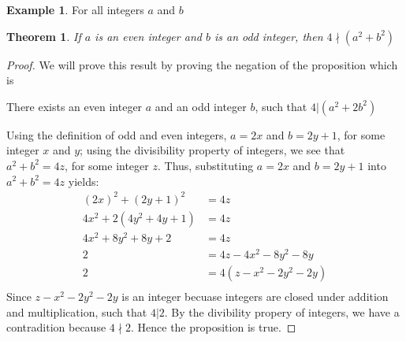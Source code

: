 \documentclass{book}
\newtheorem{theorem}{Theorem}[section]
\theoremstyle{definition}
\newtheorem{example}{Example}[definition]
\theoremstyle{remark}
\begin{document}
\newpage
\begin{example}
For all integers $a$ and $b$
\begin{tcolorbox}
	\begin{theorem}
	\label{the2}		
		If $a$ is an even integer and $b$ is an odd integer, then $4 \nmid (a^2 + b^2)$ 
	\end{theorem}
\end{tcolorbox}

\begin{proof}
    We will prove this result by proving the negation of the proposition which is
    	\begin{center}
    		There exists an even integer $a$ and an odd integer $b$, such that $4 | (a^2 + 2b^2)$
    	\end{center}
    
    Using the definition of odd and even integers, $a = 2x$ and $b = 2y + 1$, for some integer $x$ and $y$; using the divisibility property of integers, we see that $a^2 + b^2 = 4z$, for some integer $z$. Thus, substituting $a = 2x$ and $b = 2y + 1$ into $a^2 + b^2 = 4z$ yields: 
        \begin{align*}
            (2x)^2 + (2y + 1)^2 & = 4z \\
            4x^2 + 2(4y^2 + 4y + 1) & = 4z \\
            4x^2 + 8y^2 + 8y + 2 & = 4z \\
            2 & = 4z - 4x^2 - 8y^2 - 8y  \\
            2 & = 4(z - x^2 - 2y^2 - 2y) \\
        \end{align*}
    Since $z - x^2 - 2y^2 - 2y$ is an integer becuase integers are closed under addition and multiplication, such that $4 | 2$. By the divibility propery of integers, we have a contradition because $4 \nmid 2$. Hence the proposition is true. 
\end{proof}
\end{example}
\end{document}
